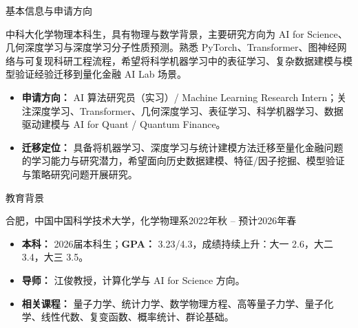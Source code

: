 \documentclass[]{mcdowellcv}
\begin{document}
\makeheader

\begin{cvsection}{基本信息与申请方向}
    \begin{cvsubsection}{}{}{}
        中科大化学物理本科生，具有物理与数学背景，主要研究方向为 AI for Science、几何深度学习与深度学习分子性质预测。熟悉 PyTorch、Transformer、图神经网络与可复现科研工程流程，希望将科学机器学习中的表征学习、复杂数据建模与模型验证经验迁移到量化金融 AI Lab 场景。
        \begin{itemize}
            \item \textbf{申请方向：} AI 算法研究员（实习）/ Machine Learning Research Intern；关注深度学习、Transformer、几何深度学习、表征学习、科学机器学习、数据驱动建模与 AI for Quant / Quantum Finance。
            \item \textbf{迁移定位：} 具备将机器学习、深度学习与统计建模方法迁移至量化金融问题的学习能力与研究潜力，希望面向历史数据建模、特征/因子挖掘、模型验证与策略研究问题开展研究。
        \end{itemize}
    \end{cvsubsection}
\end{cvsection}

\begin{cvsection}{教育背景}
    \begin{cvsubsection}{合肥，中国}{中国科学技术大学，化学物理系}{2022年秋 -- 预计2026年春}
        \begin{itemize}
            \item \textbf{本科：} 2026届本科生；\textbf{GPA：} 3.23/4.3，成绩持续上升：大一 2.6，大二 3.4，大三 3.5。
            \item \textbf{导师：} 江俊教授，计算化学与 AI for Science 方向。
            \item \textbf{相关课程：} 量子力学、统计力学、数学物理方程、高等量子力学、量子化学、线性代数、复变函数、概率统计、群论基础。
        \end{itemize}
    \end{cvsubsection}
\end{cvsection}
\end{document}
